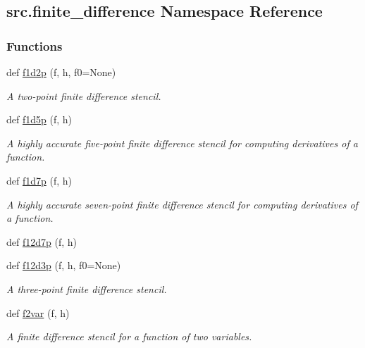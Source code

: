 \hypertarget{namespacesrc_1_1finite__difference}{}\subsection{src.\+finite\+\_\+difference Namespace Reference}
\label{namespacesrc_1_1finite__difference}
\subsubsection*{Functions}
\begin{DoxyCompactItemize}
\item 
def \hyperlink{namespacesrc_1_1finite__difference_a0be718f014c3197c50ee4f5fbec9528d}{f1d2p} (f, h, f0=None)
\begin{DoxyCompactList}\small\item\em A two-\/point finite difference stencil. \end{DoxyCompactList}\item 
def \hyperlink{namespacesrc_1_1finite__difference_af922da6a4776261be0b4d59b238fb20c}{f1d5p} (f, h)
\begin{DoxyCompactList}\small\item\em A highly accurate five-\/point finite difference stencil for computing derivatives of a function. \end{DoxyCompactList}\item 
def \hyperlink{namespacesrc_1_1finite__difference_a49f3f0fa01ca9196dc99d73fd3dadf5a}{f1d7p} (f, h)
\begin{DoxyCompactList}\small\item\em A highly accurate seven-\/point finite difference stencil for computing derivatives of a function. \end{DoxyCompactList}\item 
def \hyperlink{namespacesrc_1_1finite__difference_a50a4e1556e52c97b3237d9216360f2cf}{f12d7p} (f, h)
\item 
def \hyperlink{namespacesrc_1_1finite__difference_a32a990bb791a59853130d9d71387822d}{f12d3p} (f, h, f0=None)
\begin{DoxyCompactList}\small\item\em A three-\/point finite difference stencil. \end{DoxyCompactList}\item 
def \hyperlink{namespacesrc_1_1finite__difference_a524e09fa66783f7df59eaa707e28fd4c}{f2var} (f, h)
\begin{DoxyCompactList}\small\item\em A finite difference stencil for a function of two variables. \end{DoxyCompactList}\item 

\end{DoxyCompactItemize}
